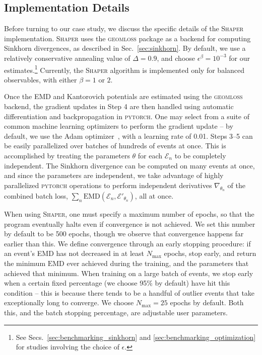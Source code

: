 \documentclass[letterpaper,11pt]{article}
\newcommand{\E}{\mathcal{E}}
\newcommand{\EMD}{\text{EMD}}
\DeclareRobustCommand{\Sec}[1]{Sec.~\ref{sec:#1}}
\DeclareRobustCommand{\Secs}[2]{Secs.~\ref{sec:#1} and \ref{sec:#2}}
\newcommand{\Adam}{{\sc Adam}\xspace}
\newcommand{\Shaper}{\textsc{Shaper}\xspace}
\begin{document}
\subsection{Implementation Details}\label{sec:implementation}

Before turning to our case study, we discuss the specific details of the \Shaper implementation.
%
\Shaper uses the \textsc{geomloss} package as a backend for computing Sinkhorn divergences, as described in \Sec{sinkhorn}. By default, we use a relatively conservative annealing value of $\Delta = 0.9$, and choose $\epsilon^\beta = 10^{-3}$ for our estimates.\footnote{See \Secs{benchmarking_sinkhorn}{benchmarking_optimization} for studies involving the choice of $\epsilon$.} Currently, the \Shaper algorithm is implemented only for balanced observables, with either $\beta = 1$ or $2$.


Once the EMD and Kantorovich potentials are estimated using the \textsc{geomloss} backend, the gradient updates in Step 4 are then handled using automatic differentiation and backpropagation in \textsc{pytorch}. One may select from a suite of common machine learning optimizers to perform the gradient update -- by default, we use the \Adam optimizer~\cite{https://doi.org/10.48550/arxiv.1412.6980}, with a learning rate of 0.01. Steps 3--5 can be easily parallelized over batches of hundreds of events at once. This is accomplished by treating the parameters $\theta$ for each $\E_n$ to be completely independent. The Sinkhorn divergence can be computed on many events at once, and since the parameters are independent, we take advantage of highly parallelized \textsc{pytorch} operations to perform independent derivatives $\nabla_{\theta_n}$ of the combined batch loss, $\sum_n \EMD(\E_n, \E'_{\theta_n})$, all at once.

When using \Shaper, one must specify a maximum number of epochs, so that the program eventually halts even if convergence is not achieved. We set this number by default to be 500 epochs, though we observe that convergence happens far earlier than this. We define convergence through an early stopping procedure: if an event's EMD has not decreased in at least $N_{\max}$ epochs, stop early, and return the minimum $\EMD$ ever achieved during the training, and the parameters that achieved that minimum. When training on a large batch of events, we stop early when a certain fixed percentage (we choose 95\% by default) have hit this condition -- this is because there tends to be a handful of outlier events that take exceptionally long to converge. 
%
We choose $N_{\max} = 25$ epochs by default. Both this, and the batch stopping percentage, are adjustable user parameters. 
\end{document}
